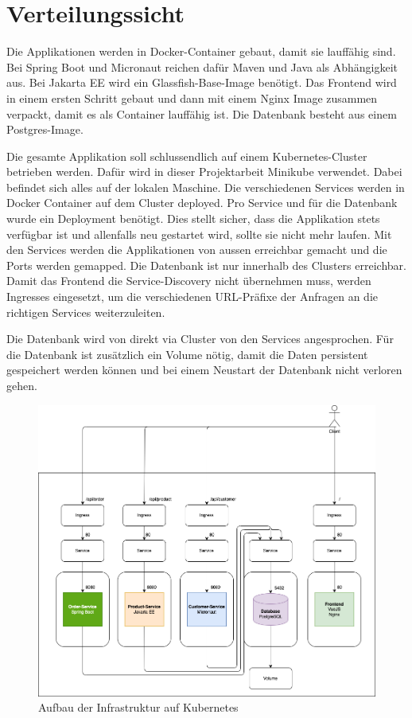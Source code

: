 
\section{Verteilungssicht}
\label{sec:verteilungssicht}
Die Applikationen werden in Docker-Container gebaut, damit sie lauffähig sind. Bei Spring Boot und Micronaut reichen dafür Maven und Java als Abhängigkeit aus. Bei Jakarta EE wird ein Glassfish-Base-Image benötigt.
Das Frontend wird in einem ersten Schritt gebaut und dann mit einem Nginx Image zusammen verpackt, damit es als Container lauffähig ist. Die Datenbank besteht aus einem Postgres-Image.

Die gesamte Applikation soll schlussendlich auf einem Kubernetes-Cluster betrieben werden. Dafür wird in dieser Projektarbeit Minikube verwendet. Dabei befindet sich alles auf der lokalen Maschine.
Die verschiedenen Services werden in Docker Container auf dem Cluster deployed. Pro Service und für die Datenbank wurde ein Deployment benötigt. Dies stellt sicher, dass die Applikation
stets verfügbar ist und allenfalls neu gestartet wird, sollte sie nicht mehr laufen. Mit den Services werden die Applikationen von aussen erreichbar gemacht und die Ports werden gemapped. Die Datenbank
ist nur innerhalb des Clusters erreichbar. Damit das Frontend die Service-Discovery nicht übernehmen muss, werden Ingresses eingesetzt, um die verschiedenen URL-Präfixe der Anfragen an die richtigen
Services weiterzuleiten.

Die Datenbank wird von direkt via Cluster von den Services angesprochen. Für die Datenbank ist zusätzlich ein Volume nötig, damit die Daten persistent gespeichert werden können und bei einem Neustart
der Datenbank nicht verloren gehen.

\begin{figure}[H]
    \centering
    \includegraphics[width=1.0\textwidth]{../images/verteilungssicht/k8s-architektur.png}
    \caption{Aufbau der Infrastruktur auf Kubernetes}
    \label{fig:infrastruktur-k8s}
\end{figure}